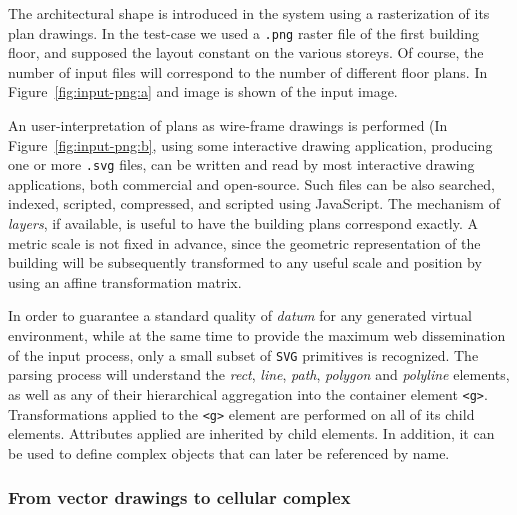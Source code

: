 \documentclass[]{egpubl}
\begin{document}
The architectural shape is introduced in the system using a rasterization of its plan drawings.
In the test-case we used a \texttt{.png} raster file of the first building floor, and supposed the layout constant on the various storeys. Of course, the number of input files will correspond to the number of different floor plans. In Figure~\ref{fig:input-png:a} and image is shown of the input image.

An user-interpretation of plans as wire-frame drawings is performed (In Figure~\ref{fig:input-png:b}, using some interactive drawing application, producing one or more \texttt{.svg} files, can be written and read by most
interactive drawing applications, both commercial and open-source. Such
files can be also searched, indexed, scripted, compressed, and scripted  using JavaScript. The mechanism of \emph{layers}, if available, is useful to have the building plans correspond exactly. A metric scale is not fixed in advance, since the geometric representation of the building will be subsequently transformed to any useful scale and position by using an affine transformation matrix.

In order to guarantee a standard quality of \emph{datum} for any generated
virtual environment, while at the same time to provide the maximum web 
dissemination of the input process, only a small subset of
\texttt{SVG} primitives is recognized. The
parsing process will understand the \emph{rect}, \emph{line}, \emph{path}, \emph{polygon} and \emph{polyline} elements, as well as any of
their hierarchical aggregation into the container element
\texttt{\textless{}g\textgreater{}}. Transformations applied to the
\texttt{\textless{}g\textgreater{}} element are performed on all of its
child elements. Attributes applied are inherited by child elements. In
addition, it can be used to define complex objects that can later be
referenced by name.




\subsubsection*{From vector drawings to cellular complex}
\end{document}
